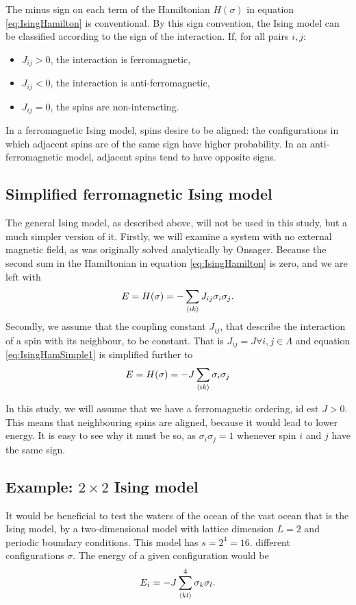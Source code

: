 \documentclass[10pt,a4paper]{amsart}
\begin{document}
The minus sign on each term of the Hamiltonian $H(\sigma)$ in equation \ref{eq:IsingHamilton} is conventional. By this sign convention, the Ising model can be classified according to the sign of the interaction. If, for all pairs $i,j$:
\begin{itemize}
\item $J_{ij} > 0$, the interaction is ferromagnetic,
\item $J_{ij} < 0$, the interaction is anti-ferromagnetic,
\item $J_{ij} = 0$, the spins are non-interacting.
\end{itemize}
In a ferromagnetic Ising model, spins desire to be aligned: the configurations in which adjacent spins are of the same sign have higher probability. In an anti-ferromagnetic model, adjacent spins tend to have opposite signs.

\subsection{Simplified ferromagnetic Ising model}
The general Ising model, as described above, will not be used in this study, but a much simpler version of it. Firstly, we will examine a system with no external magnetic field, as was originally solved analytically by Onsager\cite{Onsager}. Because the second sum in the Hamiltonian in equation \ref{eq:IsingHamilton} is zero, and we are left with
\begin{equation}
\label{eq:IsingHamSimple1}
E = H(\sigma) = -\sum_{\ev{ik}}J_{ij}\sigma_i\sigma_j.
\end{equation} 
Secondly, we assume that the coupling constant $J_{ij}$, that describe the interaction of a spin with its neighbour, to be constant. That is $J_{ij} = J \forall i,j \in \Lambda$ and equation \ref{eq:IsingHamSimple1} is simplified further to
\begin{equation}
\label{eq:IsingHamSimple2}
E = H(\sigma) = -J \sum_{\ev{ik}}\sigma_i\sigma_j
\end{equation}

In this study, we will assume that we have a ferromagnetic ordering, id est  $J>0$. This means that neighbouring spins are aligned, because it would lead to lower energy. It is easy to see why it must be so, as $\sigma_i\sigma_j=1$ whenever spin $i$ and $j$ have the same sign.

\subsection{Example: $2\times2$ Ising model}
It would be beneficial to test the waters of the ocean of the vast ocean that is the Ising model, by a two-dimensional model with lattice dimension $L=2$ and periodic boundary conditions. This model has $s=2^4=16.$ different configurations $\sigma$. The energy of a given configuration would be
\begin{equation*}
E_i = -J \sum_{\ev{kl}}^4 \sigma_k \sigma_l.
\end{equation*}
\end{document}
